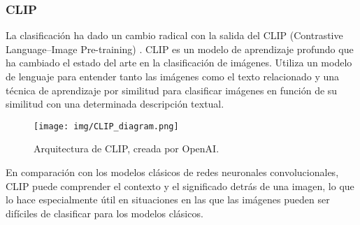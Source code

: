 \documentclass[10pt,a4paper,twocolumn,twoside]{article}
\begin{document}
\subsubsection{CLIP}

La clasificación ha dado un cambio radical con la salida del CLIP (Contrastive Language–Image Pre-training) \cite{clip}. CLIP es un modelo de aprendizaje profundo que ha cambiado el estado del arte en la clasificación de imágenes. Utiliza un modelo de lenguaje para entender tanto las imágenes como el texto relacionado y una técnica de aprendizaje por similitud para clasificar imágenes en función de su similitud con una determinada descripción textual.

\begin{figure}[h]
  \centering
  \texttt{[image: img/CLIP\_diagram.png]}
  \caption{Arquitectura de CLIP, creada por OpenAI.}
\end{figure}

En comparación con los modelos clásicos de redes neuronales convolucionales, CLIP puede comprender el contexto y el significado detrás de una imagen, lo que lo hace especialmente útil en situaciones en las que las imágenes pueden ser difíciles de clasificar para los modelos clásicos.
\end{document}
